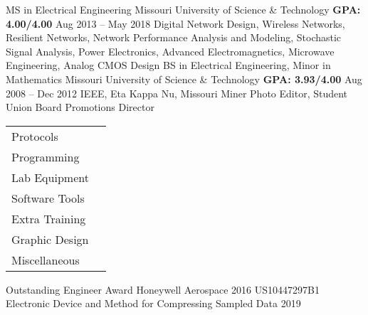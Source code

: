 \documentclass[]{awesome-cv}
\begin{document}
\newpage 
\vspace*{0mm}

\begin{cventries}
	\cventry
	{MS in Electrical Engineering}
	{Missouri University of Science \& Technology}
	{\bfseries GPA: 4.00/4.00}
	{Aug 2013 – May 2018}
	{Digital Network Design, Wireless Networks, Resilient Networks, Network Performance Analysis and Modeling, \newline Stochastic Signal Analysis, Power Electronics, Advanced Electromagnetics, Microwave Engineering, Analog CMOS Design}
	\cventry
	{BS in Electrical Engineering, Minor in Mathematics}
	{Missouri University of Science \& Technology}
	{\bfseries GPA: 3.93/4.00}
	{Aug 2008 – Dec 2012}
	{IEEE, Eta Kappa Nu, Missouri Miner Photo Editor, Student Union Board Promotions Director} %
\end{cventries}

\vspace*{0mm}

\begin{cventries}
	\cventry
	{\def\arraystretch{1.5}{\begin{tabular}{ l l}
		Protocols  & {\skill{ Ethernet, USB, WiFi, BT, I2C, SPI, HDMI, MIPI, GPS, UART, PCIe}} \\
		Programming  & {\skill{ Python, PowerShell, VB.NET, Java, MATLAB, Arduino, Git, Subversion, TestStand, ADB, VISA}} \\
		Lab Equipment  & {\skill{ Oscilloscopes, multimeters, network analyzers, logic analyzers, power supplies, Raspberry Pi, Arduino, PXI}} \\
		Software Tools  & {\skill{ Schematic capture, PCB layout, Mentor Graphics, CADSTAR, OrCad, SPICE, Solidworks}} \\
		Extra Training  & {\skill{ Advanced GNSS/GPS, Radar Systems Certificate, MIL-STD 1553, Six Sigma Green Belt}} \\
		Graphic Design  & {\skill{ Adobe Photoshop, Adobe Illustrator, \LaTeX, HTML, CSS, Bootstrap}} \\
		Miscellaneous  & {\skill{ MS Office, Android, Linux, Windows, Atlassian suite, Azure DevOps}} \\
		\end{tabular}}}
	{}
	{}
	{}
	{}
\end{cventries}
\vspace{-6mm}

\begin{cvhonors}
	\cvhonor
	{Outstanding Engineer Award}
	{Honeywell Aerospace }
	{}
	{2016}
	\cvhonor
	{US10447297B1}
	{Electronic Device and Method for Compressing Sampled Data }
	{}
	{2019}
\end{cvhonors}
\end{document}
